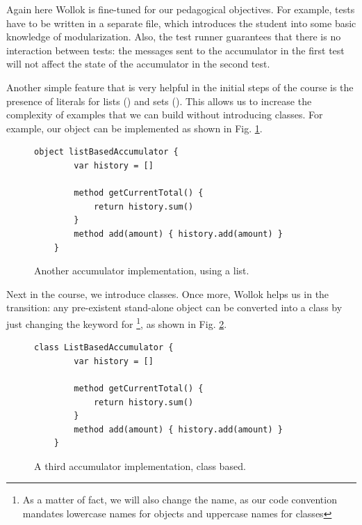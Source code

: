 Again here Wollok is fine-tuned for our pedagogical objectives.
For example, tests have to be written in a separate file, which introduces the student into some basic knowledge of modularization.
Also, the test runner guarantees that there is no interaction between tests: the messages sent to the accumulator in the first test will not affect the state of the accumulator in the second test.

\medskip
Another simple feature that is very helpful in the initial steps of the course is the presence of literals for lists (\eg \code{[1,2,3]}) and sets (\eg {}).
This allows us to increase the complexity of examples that we can build without introducing classes.
For example, our  object can be implemented as shown in Fig. \ref{fig:accumulator/list}.

\begin{figure}[ht]
 \centering
 \begin{lstlisting}[language=Wollok]
	object listBasedAccumulator {
		var history = []
		
		method getCurrentTotal() { 
			return history.sum() 
		}
		method add(amount) { history.add(amount) }
	}
 \end{lstlisting}
 
 \caption{\small Another accumulator implementation, using a list.}
 \label{fig:accumulator/list}
\end{figure}

\medskip
Next in the course, we introduce classes.
Once more, Wollok helps us in the transition: any pre-existent stand-alone object can be converted into a class by just changing the keyword  for \footnote{As a matter of fact, we will also change the name, as our code convention mandates lowercase names for objects and uppercase names for classes}, as shown in Fig. \ref{fig:accumulator/classes}.

\begin{figure}[ht]
 \centering
 \begin{lstlisting}[language=Wollok]
	class ListBasedAccumulator {
		var history = []
		
		method getCurrentTotal() { 
			return history.sum() 
		}
		method add(amount) { history.add(amount) }
	}
 \end{lstlisting}
 
 \caption{\small A third accumulator implementation, class based.}
 \label{fig:accumulator/classes}
\end{figure}

